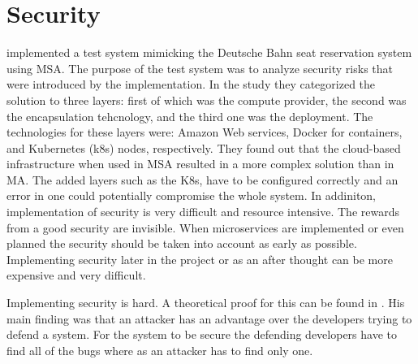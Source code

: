 

\section{Security}
\begin{sloppypar}
    \citet{closer18} implemented a test system mimicking the Deutsche Bahn 
    seat reservation system using MSA. The purpose of the test system was to
    analyze security risks that were introduced by the implementation. In the 
    study they categorized the solution to three layers: first of which was the 
    compute provider, the second was the encapsulation tehcnology, and the 
    third one was the deployment. The technologies for these layers were: 
    Amazon Web services, Docker for containers, and Kubernetes (k8s) nodes, 
    respectively. They found out that the cloud-based infrastructure when used 
    in MSA resulted in a more complex solution than in MA. The added layers 
    such as the K8s, have to be configured correctly and an error in one could 
    potentially compromise the whole system. In addiniton, implementation of 
    security is very difficult and resource intensive. The rewards from a good 
    security are invisible. When microservices are implemented or even planned 
    the security should be taken into account as early as possible. 
    Implementing security later in the project or as an after thought can be 
    more expensive and very difficult.
\end{sloppypar}
\begin{sloppypar}
    Implementing security is hard. A theoretical proof for this can be found in 
    \citet{andersson2001information}. His main finding was that an attacker has 
    an advantage over the developers trying to defend a system. For the system 
    to be secure the defending developers have to find all of the bugs where as 
    an attacker has to find only one.
\end{sloppypar}




